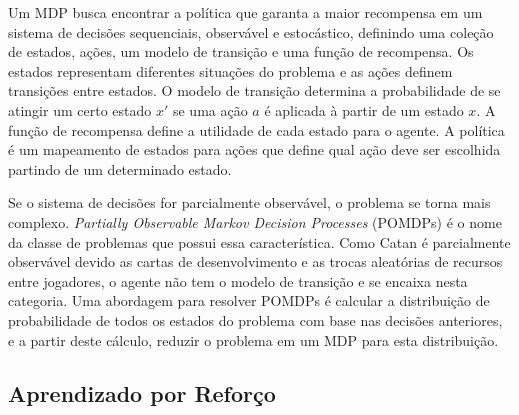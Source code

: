 Um MDP busca encontrar a política que garanta a maior recompensa em um sistema de decisões sequenciais, observável e estocástico, definindo uma coleção de estados, ações, um modelo de transição e uma função de recompensa. Os estados representam diferentes situações do problema e as ações definem transições entre estados. O modelo de transição determina a probabilidade de se atingir um certo estado $x'$ se uma ação $a$ é aplicada à partir de um estado $x$. A função de recompensa define a utilidade de cada estado para o agente. A política é um mapeamento de estados para ações que define qual ação deve ser escolhida partindo de um determinado estado.

Se o sistema de decisões for parcialmente observável, o problema se torna mais complexo. \textit{Partially Observable Markov Decision Processes} (POMDPs) é o nome da classe de problemas que possui essa característica. Como Catan é parcialmente observável devido as cartas de desenvolvimento e as trocas aleatórias de recursos entre jogadores, o agente não tem o modelo de transição e se encaixa nesta categoria.
Uma abordagem para resolver POMDPs é calcular a distribuição de probabilidade de todos os estados do problema com base nas decisões anteriores, e a partir deste cálculo, reduzir o problema em um MDP para esta distribuição.~\cite[Cap 17, pp645-647]{AIMA}



\subsection{\label{sec:secao4.2}Aprendizado por Reforço}



